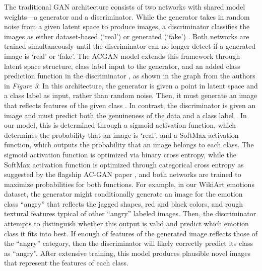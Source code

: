 \documentclass{sigchi}
\begin{document}
The traditional GAN architecture consists of two networks with shared model weights—a generator and a discriminator. While the generator takes in random noise from a given latent space to produce images, a discriminator classifies the images as either dataset-based (‘real’) or generated (‘fake’) \cite{acgan}. Both networks are trained simultaneously until the discriminator can no longer detect if a generated image is ‘real’ or ‘fake’. The ACGAN model extends this framework through latent space structure, class label input to the generator, and an added class prediction function in the discriminator \cite{10.5555/3305890.3305954}, as shown in the graph from the authors in \emph{Figure 3}. In this architecture, the generator is given a point in latent space and a class label as input, rather than random noise. Then, it must generate an image that reflects features of the given class \cite{10.5555/3305890.3305954}. In contrast, the discriminator is given an image and must predict both the genuineness of the data and a class label \cite{acgan}. In our model, this is determined through a sigmoid activation function, which determines the probability that an image is ‘real’, and a SoftMax activation function, which outputs the probability that an image belongs to each class. The sigmoid activation function is optimized via binary cross entropy, while the SoftMax activation function is optimized through categorical cross entropy as suggested by the flagship AC-GAN paper \cite{10.5555/3305890.3305954}, and both networks are trained to maximize probabilities for both functions. For example, in our WikiArt emotions dataset, the generator might conditionally generate an image for the emotion class “angry” that reflects the jagged shapes, red and black colors, and rough textural features typical of other “angry” labeled images. Then, the discriminator attempts to distinguish whether this output is valid and predict which emotion class it fits into best. If enough of features of the generated image reflects those of the “angry” category, then the discriminator will likely correctly predict its class as “angry”. After extensive training, this model produces plausible novel images that represent the features of each class. 
\end{document}
